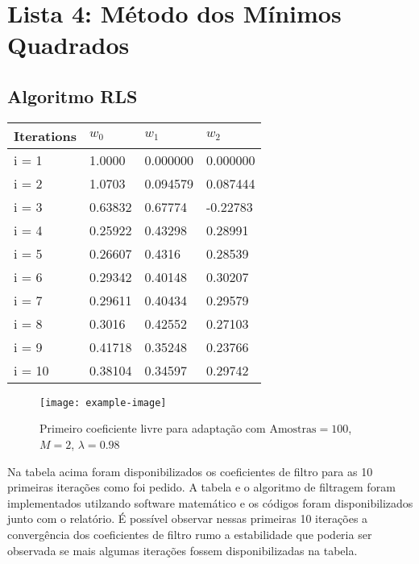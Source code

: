 \section{Lista 4: Método dos Mínimos Quadrados} %


\subsection{Algoritmo RLS} %

\begin{table}[!htp]
    \centering
    \begin{tabular}{|l|l|l|l|}
        \hline
        Iterations & $w_{0}$ & $w_{1}$ & $w_{2}$ \\ 
        \hline 
        i = 1 & 1.0000 & 0.000000 & 0.000000 \\ \hline
        i = 2 & 1.0703 & 0.094579 & 0.087444 \\ \hline
        i = 3 & 0.63832 & 0.67774 & -0.22783 \\ \hline
        i = 4 & 0.25922 & 0.43298 & 0.28991 \\ \hline
        i = 5 & 0.26607 & 0.4316 & 0.28539 \\ \hline
        i = 6 & 0.29342 & 0.40148 & 0.30207 \\ \hline
        i = 7 & 0.29611 & 0.40434 & 0.29579 \\ \hline
        i = 8 & 0.3016 & 0.42552 & 0.27103 \\ \hline
        i = 9 & 0.41718 & 0.35248 & 0.23766 \\ \hline
        i = 10 & 0.38104 & 0.34597 & 0.29742 \\ \hline 
    \end{tabular}
\end{table}

\begin{figure}[!htp]
    \centering
    \texttt{[image: example-image]}
    \caption{Primeiro coeficiente livre para adaptação com $\text{Amostras} = 100$, $M = 2$, $\lambda = 0.98$}
    \label{fig:L4Q1}
\end{figure}

Na tabela acima foram disponibilizados os coeficientes de filtro para as 10 primeiras iterações como foi pedido. 
A tabela e o algoritmo de filtragem foram implementados utilzando software matemático e os códigos foram disponibilizados junto com 
o relatório. É possível observar nessas primeiras 10 iterações a convergência dos coeficientes de filtro rumo a estabilidade que poderia
ser observada se mais algumas iterações fossem disponibilizadas na tabela. 

